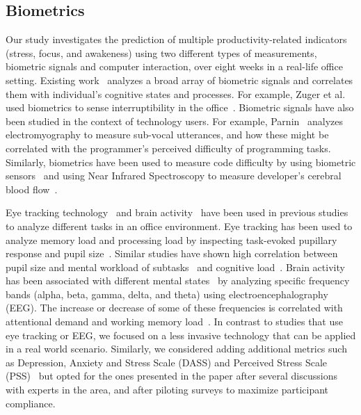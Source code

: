 \subsection{Biometrics}
Our study investigates the prediction of multiple productivity-related indicators (stress, focus, and awakeness) using two different types of measurements, biometric signals and computer interaction, over eight weeks in a real-life office setting.
Existing work~\cite{sano2013stress,healey2005detecting,wijsman2011towards,zuger2015interruptibility,goyal2017intelligent,Parnin2011,Nakagawa2014,Radevski2015} analyzes a broad array of biometric signals and correlates them with individual's cognitive states and processes.
For example, Zuger et al.~\cite{zuger18} used biometrics to sense interruptibility in the office~\cite{zuger18}.
Biometric signals have also been studied in the context of technology users. For example, Parnin~\cite{Parnin2011} analyzes electromyography to measure sub-vocal utterances, and how these might be correlated with the programmer's perceived difficulty of programming tasks. Similarly, biometrics have been used to measure code difficulty by using biometric sensors~\cite{fritz2014using}
and using Near Infrared Spectroscopy to measure developer's cerebral blood flow~\cite{Nakagawa2014}.

Eye tracking technology~\cite{Bednarik2006,Crosby1990,Rodeghero2014} and brain activity~\cite{Ikutani2014,Siegmund2014} 
have been used in previous studies to analyze different tasks in an office environment.
Eye tracking has been used to analyze memory load and processing load by inspecting task-evoked pupillary response and pupil size~\cite{beatty82}. Similar studies have shown high correlation between pupil size and mental workload of subtasks~\cite{beatty82} and cognitive load~\cite{Klingner10}.
Brain activity has been associated with different mental states~\cite{Berger29} by analyzing specific frequency bands (alpha, beta, gamma, delta, and theta) using electroencephalography (EEG). The increase or decrease of some of these frequencies is correlated with
attentional demand and working memory load~\cite{Smith05,sterman93}.
In contrast to studies that use eye tracking or EEG, we focused on a less invasive technology that can be applied in a real world scenario.
Similarly, we considered adding additional metrics such as Depression, Anxiety and Stress Scale (DASS) and Perceived Stress Scale (PSS)~\cite{Ferdous15} but opted for the ones presented in the paper after several discussions with experts in the area, and after piloting surveys to maximize participant compliance.


